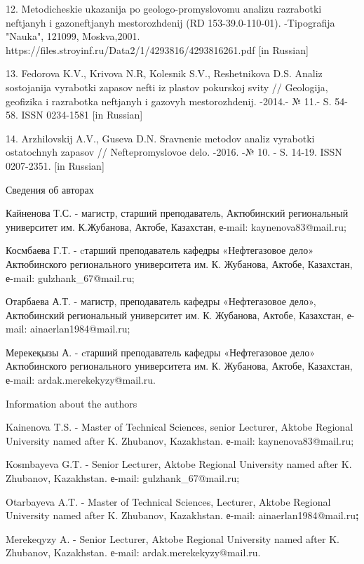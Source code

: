 12. Metodicheskie ukazanija po geologo-promyslovomu analizu razrabotki
neftjanyh i gazoneftjanyh mestorozhdenij (RD 153-39.0-110-01).
-Tipografija "Nauka", 121099, Moskva,2001.
https://files.stroyinf.ru/Data2/1/4293816/4293816261.pdf {[}in
Russian{]}

13. Fedorova K.V., Krivova N.R, Kolesnik S.V., Reshetnikova D.S. Analiz
sostojanija vyrabotki zapasov nefti iz plastov pokurskoj svity //
Geologija, geofizika i razrabotka neftjanyh i gazovyh mestorozhdenij.
-2014.- № 11.- S. 54-58. ISSN 0234-1581 {[}in Russian{]}

14. Arzhilovskij A.V., Guseva D.N. Sravnenie metodov analiz vyrabotki
ostatochnyh zapasov // Neftepromyslovoe delo. -2016. -№ 10. - S. 14-19.
ISSN 0207-2351. {[}in Russian{]}

Сведения об авторах

Кайненова Т.С. - магистр, старший преподаватель, Актюбинский
региональный университет им. К.Жубанова, Актобе, Казахстан, е-mail:
kaynenova83@mail.ru;

Космбаева Г.Т. - cтарший преподаватель кафедры «Нефтегазовое дело»
Актюбинского регионального университета им. К. Жубанова, Актобе,
Казахстан, е-mail: gulzhank\_67@mail.ru;

Отарбаева А.Т. - магистр, преподаватель кафедры «Нефтегазовое дело»,
Актюбинский региональный университет им. К. Жубанова, Актобе, Казахстан,
е-mail: ainaerlan1984@mail.ru;

Мерекеқызы А. - cтарший преподаватель кафедры «Нефтегазовое дело»
Актюбинского регионального университета им. К. Жубанова, Актобе,
Казахстан, е-mail: ardak.merekekyzy@mail.ru.

Information about the authors

Kainenova T.S. - Master of Technical Sciences, senior Lecturer, Aktobe
Regional University named after K. Zhubanov, Kazakhstan. е-mail:
kaynenova83@mail.ru;

Kosmbayeva G.T. - Senior Lecturer, Aktobe Regional University named
after K. Zhubanov, Kazakhstan. е-mail: gulzhank\_67@mail.ru;

Otarbayeva A.T. - Master of Technical Sciences, Lecturer, Aktobe
Regional University named after K. Zhubanov, Kazakhstan. е-mail:
ainaerlan1984@mail.ru{\bfseries ;}

Merekeqyzy A. - Senior Lecturer, Aktobe Regional University named after
K. Zhubanov, Kazakhstan. е-mail: ardak.merekekyzy@mail.ru.











